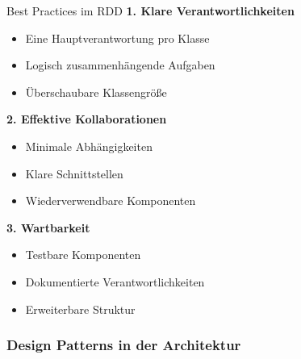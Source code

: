 \begin{concept}{Best Practices im RDD}
\textbf{1. Klare Verantwortlichkeiten}
\begin{itemize}
    \item Eine Hauptverantwortung pro Klasse
    \item Logisch zusammenhängende Aufgaben
    \item Überschaubare Klassengröße
\end{itemize}

\textbf{2. Effektive Kollaborationen}
\begin{itemize}
    \item Minimale Abhängigkeiten
    \item Klare Schnittstellen
    \item Wiederverwendbare Komponenten
\end{itemize}

\textbf{3. Wartbarkeit}
\begin{itemize}
    \item Testbare Komponenten
    \item Dokumentierte Verantwortlichkeiten
    \item Erweiterbare Struktur
\end{itemize}
\end{concept}

\subsubsection{Design Patterns in der Architektur}

